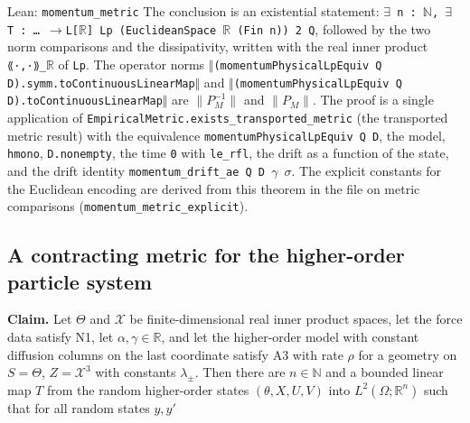 \documentclass[11pt,a4paper]{report}
\begin{document}
\begin{leanbox}{Lean: \texttt{momentum\_\allowbreak{}metric}}
The conclusion is an existential statement: \texttt{\ensuremath{\exists} n : \ensuremath{\mathbb N}, \ensuremath{\exists} T : … \ensuremath{\to}L[\ensuremath{\mathbb R}] Lp (Euclidean\allowbreak{}Space \ensuremath{\mathbb R} (Fin n)) 2 Q}, followed by the two norm comparisons and the dissipativity, written with the real inner product \texttt{{\leanfallback ⟪}·,·{\leanfallback ⟫}\_\allowbreak{}\ensuremath{\mathbb R}} of \texttt{Lp}. The operator norms \texttt{\ensuremath{\Vert}(momentum\allowbreak{}Physical\allowbreak{}Lp\allowbreak{}Equiv Q D).\allowbreak{}symm.\allowbreak{}to\allowbreak{}Continuous\allowbreak{}Linear\allowbreak{}Map\ensuremath{\Vert}} and \texttt{\ensuremath{\Vert}(momentum\allowbreak{}Physical\allowbreak{}Lp\allowbreak{}Equiv Q D).\allowbreak{}to\allowbreak{}Continuous\allowbreak{}Linear\allowbreak{}Map\ensuremath{\Vert}} are \(\|P_M^{-1}\|\) and \(\|P_M\|\). The proof is a single application of \texttt{Empirical\allowbreak{}Metric.\allowbreak{}exists\_\allowbreak{}transported\_\allowbreak{}metric} (the transported metric result) with the equivalence \texttt{momentum\allowbreak{}Physical\allowbreak{}Lp\allowbreak{}Equiv Q D}, the model, \texttt{hmono}, \texttt{D.\allowbreak{}nonempty}, the time \texttt{0} with \texttt{le\_\allowbreak{}rfl}, the drift as a function of the state, and the drift identity \texttt{momentum\_\allowbreak{}drift\_\allowbreak{}ae Q D \ensuremath{\gamma} \ensuremath{\sigma}}. The explicit constants for the Euclidean encoding are derived from this theorem in the file on metric comparisons (\texttt{momentum\_\allowbreak{}metric\_\allowbreak{}explicit}).
\end{leanbox}
\subsection{\texorpdfstring{A contracting metric for the higher-order particle system}{A contracting metric for the higher-order particle system}}


\textbf{Claim.} Let \(\Theta\) and \(\mathcal X\) be finite-dimensional real inner product spaces, let the force data satisfy N1, let \(\alpha,\gamma\in\mathbb R\), and let the higher-order model with constant diffusion columns on the last coordinate satisfy A3 with rate \(\rho\) for a geometry on \(S=\Theta\), \(Z=\mathcal X^3\) with constants \(\lambda_\pm\). Then there are \(n\in\mathbb N\) and a bounded linear map \(T\) from the random higher-order states \((\theta,X,U,V)\) into \(L^2(\Omega;\mathbb R^n)\) such that for all random states \(y,y'\)
\end{document}
